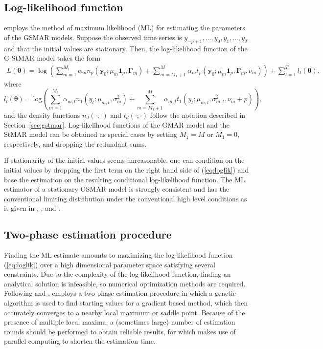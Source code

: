 \documentclass[nojss]{jss} %
\begin{document}
\subsection{Log-likelihood function}\label{sec:loglik}
 employs the method of maximum likelihood (ML) for estimating the parameters of the GSMAR models. Suppose the observed time series is $y_{-p+1},...,y_0,y_1,...,y_T$ and that the initial values are stationary. Then, the log-likelihood function of the G-StMAR model takes the form
\begin{multline}\label{eq:loglik}
L(\boldsymbol{\theta})=
\log\left(\sum_{m=1}^{M_1}\alpha_m n_p(\boldsymbol{y}_0;\mu_m\mathbf{1}_p,\boldsymbol{\Gamma}_m)+\sum_{m=M_1+1}^{M}\alpha_m t_p(\boldsymbol{y}_0;\mu_m\mathbf{1}_p,\boldsymbol{\Gamma}_m,\nu_m) \right)+\sum_{t=1}^{T}l_t(\boldsymbol{\theta}),
\end{multline}
where
\begin{equation}\label{eq:loglik2}
l_t(\boldsymbol{\theta})=\text{log}\left(\sum_{m=1}^{M_1}\alpha_{m,t}n_1(y_t;\mu_{m,t},\sigma_m^2)+\sum_{m=M_1+1}^{M}\alpha_{m,t} t_1\left(y_t;\mu_{m,t},\sigma_{m,t}^2,\nu_m+p\right)\right),
\end{equation}
and the density functions $n_d(\cdot;\cdot)$ and $t_d\left(\cdot;\cdot\right)$ follow the notation described in Section~\ref{sec:gstmar}. Log-likelihood functions of the GMAR model and the StMAR model can be obtained as special cases by setting $M_1=M$ or $M_1=0$, respectively, and dropping the redundant sums.

If stationarity of the initial values seems unreasonable, one can condition on the initial values by dropping the first term on the right hand side of (\ref{eq:loglik}) and base the estimation on the resulting conditional log-likelihood function. The ML estimator of a stationary GSMAR model is strongly consistent and has the conventional limiting distribution under the conventional high level conditions as is given in \citet[pp.254-255]{Kalliovirta+Meitz+Saikkonen:2015}, \citet[Theorem 2]{Meitz+Preve+Saikkonen:2021}, and \citet[Theorem 2]{Virolainen:2020}.

\subsection{Two-phase estimation procedure}\label{sec:estimscheme}
Finding the ML estimate amounts to maximizing the log-likelihood function (\ref{eq:loglik}) over a high dimensional parameter space satisfying several constraints. Due to the complexity of the log-likelihood function, finding an analytical solution is infeasible, so numerical optimization methods are required. Following \cite{Dorsey+Mayer:1995} and \cite{Meitz+Preve+Saikkonen:2021, Meitz+Preve+Saikkonen2:2018},  employs a two-phase estimation procedure in which a genetic algorithm is used to find starting values for a gradient based method, which then accurately converges to a nearby local maximum or saddle point. Because of the presence of multiple local maxima, a (sometimes large) number of estimation rounds should be performed to obtain reliable results, for which  makes use of parallel computing to shorten the estimation time.
\end{document}
